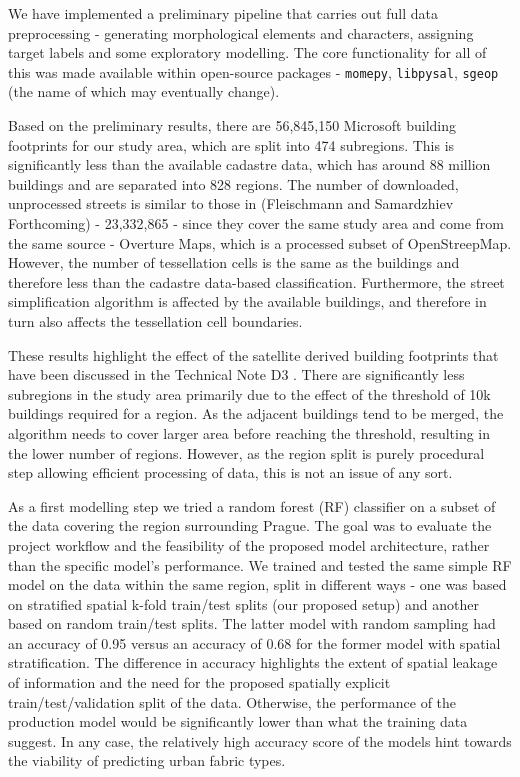 \documentclass[
  letterpaper,
  DIV=11,
  numbers=noendperiod]{scrartcl}
\begin{document}
We have implemented a preliminary pipeline that carries out full data
preprocessing - generating morphological elements and characters,
assigning target labels and some exploratory modelling. The core
functionality for all of this was made available within open-source
packages - \texttt{momepy}, \texttt{libpysal}, \texttt{sgeop} (the name
of which may eventually change).

Based on the preliminary results, there are 56,845,150 Microsoft
building footprints for our study area, which are split into 474
subregions. This is significantly less than the available cadastre data,
which has around 88 million buildings and are separated into 828
regions. The number of downloaded, unprocessed streets is similar to
those in (Fleischmann and Samardzhiev Forthcoming) - 23,332,865 - since
they cover the same study area and come from the same source - Overture
Maps, which is a processed subset of OpenStreepMap. However, the number
of tessellation cells is the same as the buildings and therefore less
than the cadastre data-based classification. Furthermore, the street
simplification algorithm is affected by the available buildings, and
therefore in turn also affects the tessellation cell boundaries.

These results highlight the effect of the satellite derived building
footprints that have been discussed in the Technical Note D3 . There are
significantly less subregions in the study area primarily due to the
effect of the threshold of 10k buildings required for a region. As the
adjacent buildings tend to be merged, the algorithm needs to cover
larger area before reaching the threshold, resulting in the lower number
of regions. However, as the region split is purely procedural step
allowing efficient processing of data, this is not an issue of any sort.

As a first modelling step we tried a random forest (RF) classifier on a
subset of the data covering the region surrounding Prague. The goal was
to evaluate the project workflow and the feasibility of the proposed
model architecture, rather than the specific model's performance. We
trained and tested the same simple RF model on the data within the same
region, split in different ways - one was based on stratified spatial
k-fold train/test splits (our proposed setup) and another based on
random train/test splits. The latter model with random sampling had an
accuracy of 0.95 versus an accuracy of 0.68 for the former model with
spatial stratification. The difference in accuracy highlights the extent
of spatial leakage of information and the need for the proposed
spatially explicit train/test/validation split of the data. Otherwise,
the performance of the production model would be significantly lower
than what the training data suggest. In any case, the relatively high
accuracy score of the models hint towards the viability of predicting
urban fabric types.
\end{document}
